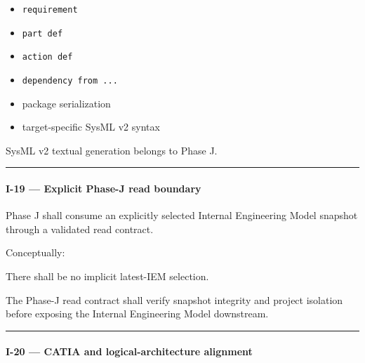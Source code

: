 \begin{itemize}
\tightlist
\item
  \texttt{requirement}
\item
  \texttt{part\ def}
\item
  \texttt{action\ def}
\item
  \texttt{dependency\ from\ ...}
\item
  package serialization
\item
  target-specific SysML v2 syntax
\end{itemize}

SysML v2 textual generation belongs to Phase J.

\begin{center}\rule{0.5\linewidth}{0.5pt}\end{center}

\hypertarget{i-19--explicit-phase-j-read-boundary}{%
\paragraph{I-19 --- Explicit Phase-J read boundary}\label{i-19--explicit-phase-j-read-boundary}}

Phase J shall consume an explicitly selected Internal Engineering Model snapshot through a validated read contract.

Conceptually:

\begin{Shaded}
\begin{Highlighting}[]
\NormalTok{) }\OperatorTok{{-}\textgreater{}}
\end{Highlighting}
\end{Shaded}

There shall be no implicit latest-IEM selection.

The Phase-J read contract shall verify snapshot integrity and project isolation before exposing the Internal Engineering Model downstream.

\begin{center}\rule{0.5\linewidth}{0.5pt}\end{center}

\hypertarget{i-20--catia-and-logical-architecture-alignment}{%
\paragraph{I-20 --- CATIA and logical-architecture alignment}\label{i-20--catia-and-logical-architecture-alignment}}

